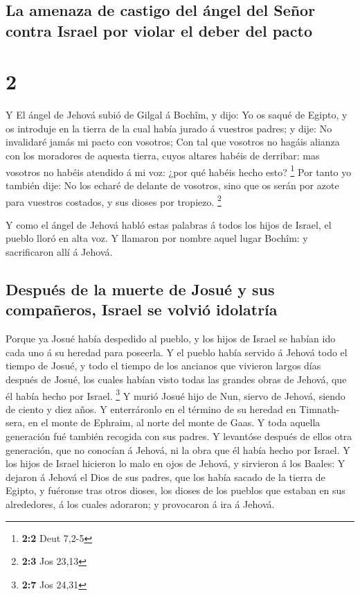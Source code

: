 \hypertarget{la-amenaza-de-castigo-del-uxe1ngel-del-seuxf1or-contra-israel-por-violar-el-deber-del-pacto}{%
\subsection{La amenaza de castigo del ángel del Señor contra Israel por
violar el deber del
pacto}\label{la-amenaza-de-castigo-del-uxe1ngel-del-seuxf1or-contra-israel-por-violar-el-deber-del-pacto}}

\hypertarget{section-1}{%
\section{2}\label{section-1}}

 Y El ángel de Jehová subió de Gilgal á Bochîm, y dijo: Yo
os saqué de Egipto, y os introduje en la tierra de la cual había jurado
á vuestros padres; y dije: No invalidaré jamás mi pacto con vosotros;
 Con tal que vosotros no hagáis alianza con los moradores de
aquesta tierra, cuyos altares habéis de derribar: mas vosotros no habéis
atendido á mi voz: ¿por qué habéis hecho esto? \footnote{\textbf{2:2}
  Deut 7,2-5}  Por tanto yo también dije: No los echaré de
delante de vosotros, sino que os serán por azote para vuestros costados,
y sus dioses por tropiezo. \footnote{\textbf{2:3} Jos 23,13}

 Y como el ángel de Jehová habló estas palabras á todos los
hijos de Israel, el pueblo lloró en alta voz.  Y llamaron
por nombre aquel lugar Bochîm: y sacrificaron allí á Jehová.

\hypertarget{despuuxe9s-de-la-muerte-de-josuuxe9-y-sus-compauxf1eros-israel-se-volviuxf3-idolatruxeda}{%
\subsection{Después de la muerte de Josué y sus compañeros, Israel se
volvió
idolatría}\label{despuuxe9s-de-la-muerte-de-josuuxe9-y-sus-compauxf1eros-israel-se-volviuxf3-idolatruxeda}}

 Porque ya Josué había despedido al pueblo, y los hijos de
Israel se habían ido cada uno á su heredad para poseerla.  Y
el pueblo había servido á Jehová todo el tiempo de Josué, y todo el
tiempo de los ancianos que vivieron largos días después de Josué, los
cuales habían visto todas las grandes obras de Jehová, que él había
hecho por Israel. \footnote{\textbf{2:7} Jos 24,31}  Y murió
Josué hijo de Nun, siervo de Jehová, siendo de ciento y diez años.
 Y enterráronlo en el término de su heredad en Timnath-sera,
en el monte de Ephraim, al norte del monte de Gaas.  Y toda
aquella generación fué también recogida con sus padres. Y levantóse
después de ellos otra generación, que no conocían á Jehová, ni la obra
que él había hecho por Israel.  Y los hijos de Israel
hicieron lo malo en ojos de Jehová, y sirvieron á los Baales:
 Y dejaron á Jehová el Dios de sus padres, que los había
sacado de la tierra de Egipto, y fuéronse tras otros dioses, los dioses
de los pueblos que estaban en sus alrededores, á los cuales adoraron; y
provocaron á ira á Jehová.

